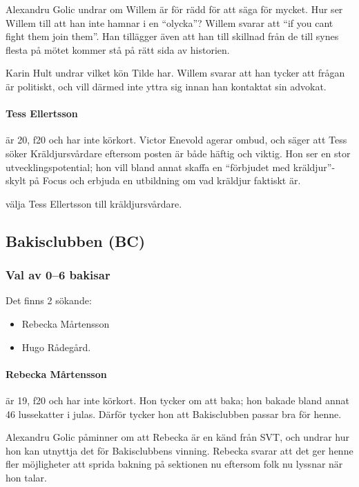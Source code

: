 \documentclass[hidelinks]{sektionsmote}
\begin{document}
Alexandru Golic undrar om Willem är för rädd för att säga för mycket.
Hur ser Willem till att han inte hamnar i en \enquote{olycka}?
Willem svarar att \enquote{if you cant fight them join them}.
Han tillägger även att han till skillnad från de till synes flesta på mötet kommer stå på rätt sida av historien.

Karin Hult undrar vilket kön Tilde har.
Willem svarar att han tycker att frågan är politiskt, och vill därmed inte yttra sig innan han kontaktat sin advokat.

\paragraph{Tess Ellertsson} är 20, f20 och har inte körkort.
Victor Enevold agerar ombud, och säger att Tess söker Kräldjursvårdare eftersom posten är både häftig och viktig.
Hon ser en stor utvecklingspotential; hon vill bland annat skaffa en \enquote{förbjudet med kräldjur}-skylt på Focus och erbjuda en utbildning om vad kräldjur faktiskt är.

\begin{beslut}
  \item välja Tess Ellertsson till kräldjursvårdare.
\end{beslut}


\subsection{Bakisclubben (BC)}
\subsubsection{Val av 0--6 bakisar}
Det finns 2 sökande:
\begin{itemize}
    \item Rebecka Mårtensson
    \item Hugo Rådegård.
\end{itemize}

\paragraph{Rebecka Mårtensson} är 19, f20 och har inte körkort.
Hon tycker om att baka; hon bakade bland annat 46 lussekatter i julas.
Därför tycker hon att Bakisclubben passar bra för henne.

Alexandru Golic påminner om att Rebecka är en känd från SVT, och undrar hur hon kan utnyttja det för Bakisclubbens vinning.
Rebecka svarar att det ger henne fler möjligheter att sprida bakning på sektionen nu eftersom folk nu lyssnar när hon talar.
\end{document}
